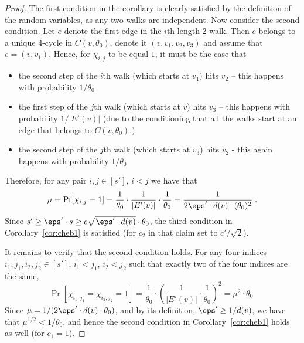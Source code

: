\begin{proof}
The first condition in the corollary is clearly satisfied by the definition of the random variables, as any two walks are independent.
Now consider the second condition.
 Let $e$ denote the first edge in the $i$th length-2 walk. Then $e$ belongs to a unique 4-cycle in $C(v,\theta_0)$, denote it $(v,v_1, v_2, v_3)$ and assume that $e=(v,v_1)$. Hence, for $\chi_{i,j}$ to be equal $1$, it must be the case that
 \begin{itemize}
     \item the second step of the $i$th walk (which starts at $v_1$)  hits $v_2$ -- this happens with probability $1/\theta_0$
     \item the first step of the $j$th walk  (which starts at $v$) hits $v_3$ -- this happens with probability $1/|E'(v)|$ (due to the conditioning that all the walks start at an edge that belongs to $C(v,\theta_0)$.)
     \item the second step of the $j$th walk (which starts at $v_3$) hits $v_2$ - this again happens with probability $1/\theta_0$  
 \end{itemize}
Therefore, for any pair $i,j\in [s']$, $i<j$ we have that
\begin{equation}
\mu = \Pr[\chi_{i,j}=1] = \frac{1}{\theta_0}\cdot \frac{1}{|E'(v)|}\cdot \frac{1}{\theta_0}
     = \frac{1}{2\eps'\cdot d(v)\cdot (\theta_0)^2}\;.
\end{equation}
Since $s' \geq \eps' \cdot s \geq  c\sqrt{\eps' \cdot d(v)}\cdot \theta_0$, the third condition in Corollary~\ref{cor:cheb1}
is satisfied (for $c_2$ in that claim set to $c'/\sqrt{2}$).

It remains to verify that the second condition holds. For any four indices $i_1,j_1,i_2,j_2\in [s']$, $i_1 < j_1$, $i_2 < j_2$ such that exactly two of the four indices are the same, 
\begin{equation}
\Pr[\chi_{i_1,j_1}=\chi_{i_2,j_2} = 1] = \frac{1}{\theta_0}\cdot \left(\frac{1}{|E'(v)|}\cdot \frac{1}{\theta_0} \right)^2
 = \mu^2 \cdot \theta_0\;
\end{equation}
Since $\mu=1/(2\eps'\cdot d(v)\cdot \theta_0)$, 
and by its definition, $\eps' \geq 1/d(v)$, %
we have that $\mu^{1/2} < 1/\theta_0$, and hence the second condition in Corollary~\ref{cor:cheb1} holds as well (for $c_1 =1$).
\fi
\end{proof}

